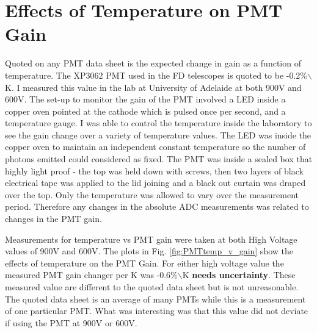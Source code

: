 \section{Effects of Temperature on PMT Gain}

Quoted on any PMT data sheet is the expected change in gain as a function of temperature. The XP3062 PMT used in the FD telescopes is quoted to be -0.2\%$\backslash$K. I measured this value in the lab at University of Adelaide at both 900V and 600V. The set-up to monitor the gain of the PMT involved a LED inside a copper oven pointed at the cathode which is pulsed once per second, and a temperature gauge. I was able to control the temperature inside the laboratory to see the gain change over a variety of temperature values. The LED was inside the copper oven to maintain an independent constant temperature so the number of photons emitted could considered as fixed. The PMT was inside a sealed box that highly light proof - the top was held down with screws, then two layers of black electrical tape was applied to the lid joining and a black out curtain was draped over the top. Only the temperature was allowed to vary over the measurement period. Therefore any changes in the absolute ADC measurements was related to changes in the PMT gain.

Measurements for temperature vs PMT gain were taken at both High Voltage values of 900V and 600V. The plots in Fig. \ref{fig:PMTtemp_v_gain} show the effects of temperature on the PMT Gain. For either high voltage value the measured PMT gain changer per K was -0.6\%$\backslash$K \textbf{needs uncertainty}. These measured value are different to the quoted data sheet but is not unreasonable. The quoted data sheet is an average of many PMTs while this is a measurement of one particular PMT. What was interesting was that this value did not deviate if using the PMT at 900V or 600V.


